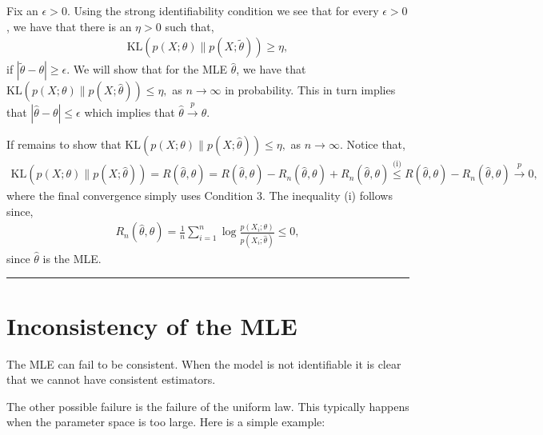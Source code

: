 \documentclass[twoside,12pt]{article}
\newenvironment{proof}{{\bf Proof:}}{\hfill\rule{2mm}{2mm}}
\newcommand{\cprob}{\overset{p}{\rightarrow}}
\begin{document}
\begin{proof}
Fix an $\epsilon > 0$.
Using the strong identifiability condition we see that for every $\epsilon > 0$, we have that there is an $\eta > 0$ such that, 
\begin{align*}
\text{KL}(p(X;\theta)\|p(X;\widetilde{\theta})) \geq \eta,
\end{align*}
if $|\widetilde{\theta} - \theta| \geq \epsilon$. We will show that for the MLE $\widehat{\theta}$, we have that $\text{KL}(p(X;\theta)\|p(X;\widehat{\theta})) \leq \eta,$ as $n \rightarrow \infty$ in probability. This in turn implies that $|\widehat{\theta} - \theta| \leq \epsilon$ which implies that $\widehat{\theta} \cprob \theta$.

If remains to show that $\text{KL}(p(X;\theta)\|p(X;\widehat{\theta})) \leq \eta,$ as $n \rightarrow \infty$. Notice that,
\begin{align*}
\text{KL}(p(X;\theta)\|p(X;\widehat{\theta})) = R(\widehat{\theta},\theta) = R(\widehat{\theta},\theta) - R_n(\widehat{\theta},\theta) + R_n(\widehat{\theta},\theta) \overset{\text{(i)}}{\leq} R(\widehat{\theta},\theta) - R_n(\widehat{\theta},\theta) \cprob 0,
\end{align*}
where the final convergence simply uses Condition 3. The inequality (i) follows since, 
\begin{align*}
R_n(\widehat{\theta},\theta) =  \frac{1}{n} \sum_{i=1}^n \log \frac{p(X_i; \theta)}{p(X_i; \widehat{\theta})} \leq 0,
\end{align*}
since $\widehat{\theta}$ is the MLE.
\end{proof}

\section{Inconsistency of the MLE}
The MLE can fail to be consistent. When the model is not identifiable it is clear that we cannot have consistent estimators. 

The other possible failure is the failure of the uniform law. This typically happens when the parameter space is too large. Here is a simple example:
\end{document}
